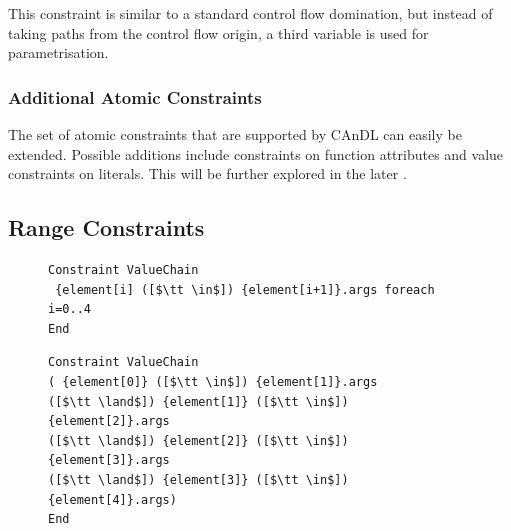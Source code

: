     \noindent
    This constraint is similar to a standard control flow domination, but
    instead of taking paths from the control flow origin, a third variable is
    used for parametrisation. 

\subsubsection{Additional Atomic Constraints}

    The set of atomic constraints that are supported by CAnDL can easily be
    extended.
    Possible additions include constraints on function attributes and value
    constraints on literals.
    This will be further explored in the later
    .

\subsection{Range Constraints}

\begin{figure}[t]
\begin{lstlisting}[language=CAnDL]
Constraint ValueChain
 {element[i] ([$\tt \in$]) {element[i+1]}.args foreach i=0..4
End
\end{lstlisting}
\begin{lstlisting}[language=CAnDL,label={fig:forall},caption=
   {Example for the expansion of range constraints in CAnDL:
    The specification at the top can be ``unrolled'' manually, resulting in the
    equivalent, but more verbose, specification below.\parfillskip=0pt}]
Constraint ValueChain
( {element[0]} ([$\tt \in$]) {element[1]}.args
([$\tt \land$]) {element[1]} ([$\tt \in$]) {element[2]}.args
([$\tt \land$]) {element[2]} ([$\tt \in$]) {element[3]}.args
([$\tt \land$]) {element[3]} ([$\tt \in$]) {element[4]}.args)
End
\end{lstlisting}
\end{figure}

